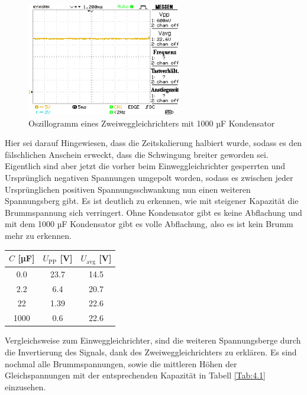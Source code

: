\documentclass[a4paper,10pt]{article}
\numberwithin{equation}{section}
\begin{document}
\begin{figure}[h]
	\centering
	\includegraphics[width=0.6\textwidth]{data/a4_d.BMP.png}
	\caption{Oszillogramm eines Zweiweggleichrichters mit 1000 µF Kondensator}
	\label{fig:4.4}
\end{figure}
Hier sei darauf Hingewiesen, dass die Zeitskalierung halbiert wurde, sodass es den fälschlichen Anschein erweckt, dass die Schwingung breiter geworden sei. Eigentlich sind aber jetzt die vorher beim Einweggleichrichter gesperrten und Ursprünglich negativen Spannungen umgepolt worden, sodass es zwischen jeder Ursprünglichen positiven Spannungsschwankung nun einen weiteren Spannungsberg gibt.
Es ist deutlich zu erkennen, wie mit steigener Kapazität die Brummspannung sich verringert. Ohne Kondensator gibt es keine Abflachung und mit dem 1000 µF Kondensator gibt es volle Abflachung, also es ist kein Brumm mehr zu erkennen.

\begin{center}
	\begin{tabular}{|c|c|c|}
		\hline
    \(C \) [µF] & \(U_{\text{PP}}\) [V] & \(U_{\text{avg}}\) [V]\\
		\hline
    0.0 & 23.7 & 14.5\\
    2.2 & 6.4 & 20.7 \\
    22 & 1.39 & 22.6 \\
    1000 & 0.6 & 22.6 \\
		\hline
	\end{tabular}
	\label{Tab:4.1}
\end{center}

Vergleichsweise zum Einweggleichrichter, sind die weiteren Spannungsberge durch die Invertierung des Signals, dank des Zweiweggleichrichters zu erklären. Es sind nochmal alle Brummspannungen, sowie die mittleren Höhen der Gleichspannungen mit der entsprechenden Kapazität in Tabell \ref{Tab:4.1} einzusehen.
\end{document}
